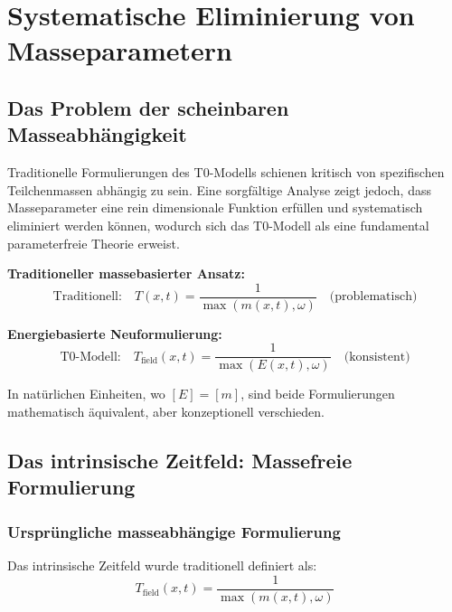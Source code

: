 \documentclass[12pt,a4paper]{report}
\begin{document}
	\section{Systematische Eliminierung von Masseparametern}
	\label{sec:mass_elimination}
	
	\subsection{Das Problem der scheinbaren Masseabhängigkeit}
	\label{subsec:mass_problem}
	
	Traditionelle Formulierungen des T0-Modells schienen kritisch von spezifischen Teilchenmassen abhängig zu sein. Eine sorgfältige Analyse zeigt jedoch, dass Masseparameter eine rein dimensionale Funktion erfüllen und systematisch eliminiert werden können, wodurch sich das T0-Modell als eine fundamental parameterfreie Theorie erweist.
	
	\textbf{Traditioneller massebasierter Ansatz:}
	\begin{equation}
		\text{Traditionell:} \quad T(x,t) = \frac{1}{\max(m(x,t), \omega)} \quad \text{(problematisch)}
	\end{equation}
	
	\textbf{Energiebasierte Neuformulierung:}
	\begin{equation}
		\text{T0-Modell:} \quad T_{\text{field}}(x,t) = \frac{1}{\max(E(x,t), \omega)} \quad \text{(konsistent)}
	\end{equation}
	
	In natürlichen Einheiten, wo $[E] = [m]$, sind beide Formulierungen mathematisch äquivalent, aber konzeptionell verschieden.
	
	\subsection{Das intrinsische Zeitfeld: Massefreie Formulierung}
	\label{subsec:time_field_elimination}
	
	\subsubsection{Ursprüngliche masseabhängige Formulierung}
	
	Das intrinsische Zeitfeld wurde traditionell definiert als:
	\begin{equation}
		T_{\text{field}}(x,t) = \frac{1}{\max(m(x,t), \omega)}
		\label{eq:time_field_original}
	\end{equation}
	
\end{document}
